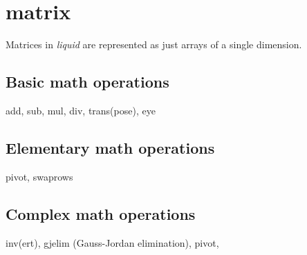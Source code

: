 % 
%
\section{matrix}
\label{module:matrix}
Matrices in {\it liquid} are represented as just arrays of a single dimension.

\subsection{Basic math operations}
\label{module:matrix:math}
add, sub, mul, div, trans(pose), eye

\subsection{Elementary math operations}
\label{module:matrix:elementary}
pivot, swaprows

\subsection{Complex math operations}
\label{module:matrix:complex}
inv(ert), gjelim (Gauss-Jordan elimination), pivot,

